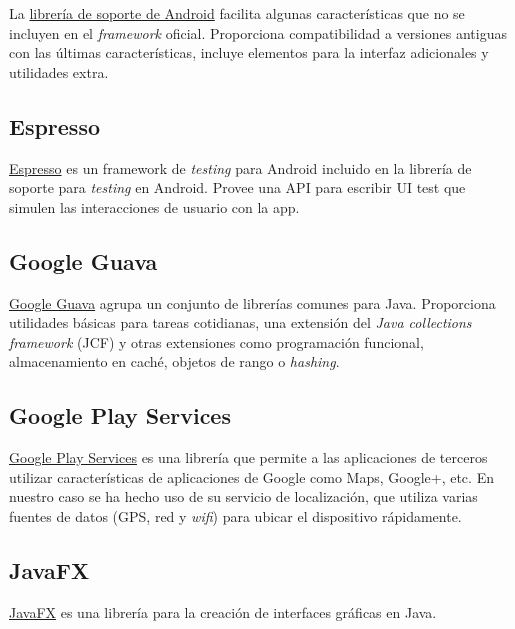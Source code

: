 La
\href{https://developer.android.com/topic/libraries/support-library/}{librería
de soporte de Android} facilita algunas características que no se
incluyen en el \emph{framework} oficial. Proporciona compatibilidad a
versiones antiguas con las últimas características, incluye elementos
para la interfaz adicionales y utilidades extra.

\subsection{Espresso}\label{espresso}

\href{https://google.github.io/android-testing-support-library/docs/espresso/}{Espresso}
es un framework de \emph{testing} para Android incluido en la librería
de soporte para \emph{testing} en Android. Provee una API para escribir
UI test que simulen las interacciones de usuario con la app.

\subsection{Google Guava}\label{google-guava}

\href{https://github.com/google/guava}{Google Guava} agrupa un conjunto
de librerías comunes para Java. Proporciona utilidades básicas para
tareas cotidianas, una extensión del \emph{Java collections framework}
(JCF) y otras extensiones como programación funcional, almacenamiento en
caché, objetos de rango o \emph{hashing}.

\subsection{Google Play Services}\label{google-play-services}

\href{https://developers.google.com/android/guides/overview}{Google Play
Services} es una librería que permite a las aplicaciones de terceros
utilizar características de aplicaciones de Google como Maps, Google+,
etc. En nuestro caso se ha hecho uso de su servicio de localización, que
utiliza varias fuentes de datos (GPS, red y \emph{wifi}) para ubicar el
dispositivo rápidamente.

\subsection{JavaFX}\label{javafx}

\href{http://docs.oracle.com/javase/8/javase-clienttechnologies.htm}{JavaFX}
es una librería para la creación de interfaces gráficas en Java.

